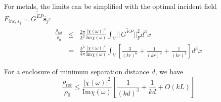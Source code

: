 \documentclass[12pt]{article}
\begin{document}
For metals, the limits can be simplified with the optimal incident field $F_{inc,s_j}=\overline{\overline{G^{EP}}}\hat{\mathbf{s}}_j$:
\begin{eqnarray}
\frac{\rho_{tot}}{\rho_0} &\leq& \frac{2\pi}{k^3}\frac{|\chi(\omega)|^2}{\mathrm{Im}\chi(\omega)}\int_V||\overline{\overline{G^{EP}}}||^2_Fd^3x\\
&=& \frac{k^3}{4\pi}\frac{|\chi(\omega)|^2}{\mathrm{Im}\chi(\omega)}\int_V[\frac{3}{(kr)^6}+\frac{1}{(kr)^4}+\frac{1}{(kr)^2}]d^3x
\end{eqnarray}

For a enclosure of minimum separation distance $d$, we have
\begin{equation}
\frac{\rho_{tot}}{\rho_0} \leq \frac{|\chi(\omega)|^2}{\mathrm{Im}\chi(\omega)}[\frac{1}{(kd)^3}+\frac{1}{kd}+O(kL)]
\end{equation}
\end{document}
